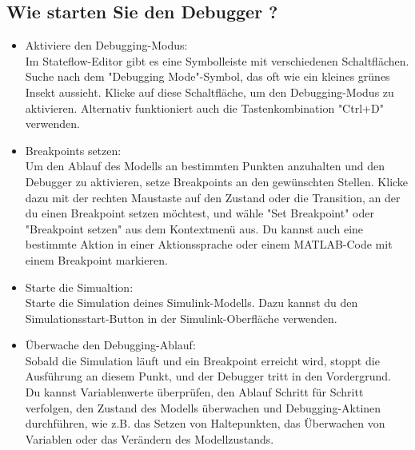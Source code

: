 \documentclass{article}
\begin{document}
\begin{multicols}{2}
		\subsection{Wie starten Sie den Debugger ?}
			\begin{itemize}
				\item Aktiviere den Debugging-Modus: \\Im Stateflow-Editor gibt es eine Symbolleiste mit verschiedenen Schaltflächen. Suche nach dem "Debugging Mode"-Symbol, das oft wie ein kleines grünes Insekt aussieht. Klicke auf diese Schaltfläche, um den Debugging-Modus zu aktivieren. Alternativ funktioniert auch die Tastenkombination "Ctrl+D" verwenden.
				\item Breakpoints setzen: \\Um den Ablauf des Modells an bestimmten Punkten anzuhalten und den Debugger zu aktivieren, setze Breakpoints an den gewünschten Stellen. Klicke dazu mit der rechten Maustaste auf den Zustand oder die Transition, an der du einen Breakpoint setzen möchtest, und wähle "Set Breakpoint" oder "Breakpoint setzen" aus dem Kontextmenü aus. Du kannst auch eine bestimmte Aktion in einer Aktionssprache oder einem MATLAB-Code mit einem Breakpoint markieren.
				\item Starte die Simualtion: \\Starte die Simulation deines Simulink-Modells. Dazu kannst du den Simulationsstart-Button in der Simulink-Oberfläche verwenden.
				\item Überwache den Debugging-Ablauf: \\Sobald die Simulation läuft und ein Breakpoint erreicht wird, stoppt die Ausführung an diesem Punkt, und der Debugger tritt in den Vordergrund. Du kannst Variablenwerte überprüfen, den Ablauf Schritt für Schritt verfolgen, den Zustand des Modells überwachen und Debugging-Aktinen durchführen, wie z.B. das Setzen von Haltepunkten, das Überwachen von Variablen oder das Verändern des Modellzustands.
			\end{itemize}
		\end{multicols}
\clearpage	
\end{document}
